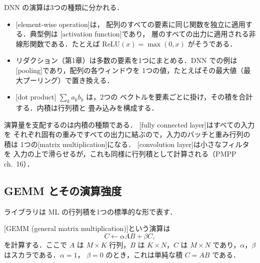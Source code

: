 \documentclass[../main.tex]{subfiles}
\begin{document}
\begin{definition}
  DNN の演算は3つの種類に分かれる．
  \begin{itemize}
    \item {}[element-wise operation]は，
      配列のすべての要素に同じ関数を独立に適用する．典型例は
      [activation function]であり，
      層のすべての出力に適用される非線形関数である．たとえば
      $\mathrm{ReLU}(x) = \max(0, x)$ がそうである．
    \item リダクション（第1章）は多数の要素を1つにまとめる．DNN での例は
      [pooling]であり，配列の各ウィンドウを
      1つの値，たとえばその最大値（最大プーリング）で置き換える．
    \item {}[dot product] $\sum_k a_k b_k$ は，2つの
      ベクトルを要素ごとに掛け，その積を合計する．内積は行列積と
      畳み込みを構成する．
  \end{itemize}
\end{definition}

演算量を支配するのは内積の種類である．
[fully connected layer]はすべての入力を
それぞれ固有の重みですべての出力に結ぶので，入力のバッチと重み行列の積は
1つの[matrix multiplication]になる．
[convolution layer]は小さなフィルタを
入力の上で滑らせるが，これも同様に行列積として計算される（PMPP
ch.~16）．

\subsection{GEMM とその演算強度}

ライブラリは ML の行列積を1つの標準的な形で表す．

\begin{definition}[GEMM]
  [GEMM (general matrix multiplication)]という演算は
  \begin{equation}
    C \leftarrow \alpha A B + \beta C ,
    \label{eq:l12-gemm}
  \end{equation}
  を計算する．ここで $A$ は $M \times K$ 行列，$B$ は $K \times N$，$C$ は
  $M \times N$ であり，$\alpha$，$\beta$ はスカラである．$\alpha = 1$，
  $\beta = 0$ のとき，これは単純な積 $C = AB$ である．
\end{definition}
\end{document}
